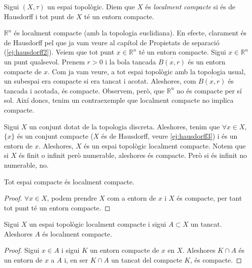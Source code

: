 \documentclass[../main.tex]{subfiles}
\begin{document}
\begin{defi}
\label{def:localmentcompacte} Sigui $(X,\tau)$ un espai topològic. Diem que $X$ és \textit{localment compacte} si és de Hausdorff i tot punt de $X$ té un entorn compacte.
\end{defi}

\begin{ej}
\label{ej:localmentcompacte1} $\mathbb{R}^n$ és localment compacte (amb la topologia euclidiana). En efecte, clarament és de Hausdorff pel que ja vam veure al capítol de Propietats de separació (\ref{ej:hausdorff2}). Veiem que tot punt $x\in\mathbb{R}^n$ té un entorn compacte. Sigui $x\in\mathbb{R}^n$ un punt qualsevol. Prenem $r>0$ i la bola tancada $\overline{B(x,r)}$ és un entorn compacte de $x$. Com ja vam veure, a tot espai topològic amb la topologia usual, un subespai era compacte si era tancat i acotat. Aleshores, com $\overline{B(x,r)}$ és tancada i acotada, és compacte. Observem, però, que $\mathbb{R}^n$ no és compacte per sí sol. Així doncs, tenim un contraexemple que localment compacte no implica compacte.
\end{ej}

\begin{ej}
\label{ej:localmentcompacte2} Sigui $X$ un conjunt dotat de la topologia discreta. Aleshores, tenim que $\forall x\in X$, $\{x\}$ és un conjunt compacte ($X$ és de Hausdorff, veure \ref{ej:hausdorff3}) i és un entorn de $x$. Aleshores, $X$ és un espai topològic localment compacte. Notem que si $X$ és finit o infinit però numerable, aleshores és compacte. Però si és infinit no numerable, no.
\end{ej}

\begin{prop}
\label{prop:compacteimplicalocalmentcompacte} Tot espai compacte és localment compacte.
\end{prop}
\begin{proof}
$\forall x\in X$, podem prendre $X$ com a entorn de $x$ i $X$ és compacte, per tant tot punt té un entorn compacte.
\end{proof}

\begin{prop}
\label{prop:tancatlocalmentcompacte} Sigui $X$ un espai topològic localment compacte i sigui $A\subset X$ un tancat. Aleshores $A$ és localment compacte.
\end{prop}
\begin{proof}
Sigui $x\in A$ i sigui $K$ un entorn compacte de $x$ en $X$. Aleshores $K\cap A$ és un entorn de $x$ a $A$ i, en ser $K\cap A$ un tancat del compacte $K$, és compacte.
\end{proof}
\end{document}
